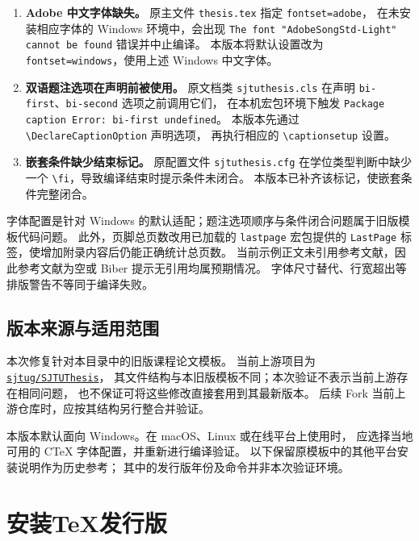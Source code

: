 \begin{enumerate}
	\item \textbf{Adobe 中文字体缺失。}
	      原主文件 \texttt{thesis.tex} 指定 \texttt{fontset=adobe}，
	      在未安装相应字体的 Windows 环境中，会出现
	      \texttt{The font "AdobeSongStd-Light" cannot be found} 错误并中止编译。
	      本版本将默认设置改为 \texttt{fontset=windows}，使用上述 Windows 中文字体。

	\item \textbf{双语题注选项在声明前被使用。}
	      原文档类 \texttt{sjtuthesis.cls} 在声明
	      \texttt{bi-first}、\texttt{bi-second} 选项之前调用它们，
	      在本机宏包环境下触发 \texttt{Package caption Error: bi-first undefined}。
	      本版本先通过 \verb|\DeclareCaptionOption| 声明选项，
	      再执行相应的 \verb|\captionsetup| 设置。

	\item \textbf{嵌套条件缺少结束标记。}
	      原配置文件 \texttt{sjtuthesis.cfg} 在学位类型判断中缺少一个
	      \verb|\fi|，导致编译结束时提示条件未闭合。
	      本版本已补齐该标记，使嵌套条件完整闭合。
\end{enumerate}

字体配置是针对 Windows 的默认适配；题注选项顺序与条件闭合问题属于旧版模板代码问题。
此外，页脚总页数改用已加载的 \texttt{lastpage} 宏包提供的
\texttt{LastPage} 标签，使增加附录内容后仍能正确统计总页数。
当前示例正文未引用参考文献，因此参考文献为空或 Biber 提示无引用均属预期情况。
字体尺寸替代、行宽超出等排版警告不等同于编译失败。

\subsection{版本来源与适用范围}

本次修复针对本目录中的旧版课程论文模板。
当前上游项目为 \href{https://github.com/sjtug/SJTUThesis}{\texttt{sjtug/SJTUThesis}}，
其文件结构与本旧版模板不同；本次验证不表示当前上游存在相同问题，
也不保证可将这些修改直接套用到其最新版本。
后续 Fork 当前上游仓库时，应按其结构另行整合并验证。

本版本默认面向 Windows。在 macOS、Linux 或在线平台上使用时，
应选择当地可用的 CTeX 字体配置，并重新进行编译验证。
以下保留原模板中的其他平台安装说明作为历史参考；
其中的发行版年份及命令并非本次验证环境。

\section{安装TeX发行版}

